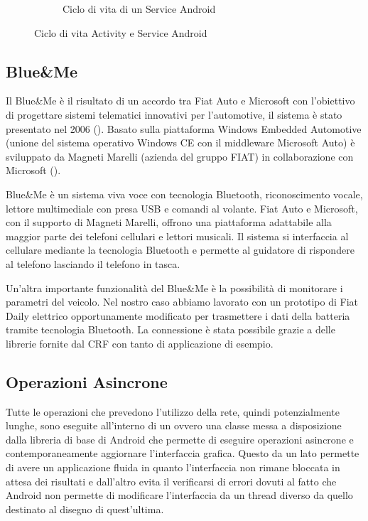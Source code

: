 \begin{figure}[H]
\begin{subfigure}[b]{0.49\textwidth}
			\caption{Ciclo di vita di un Service Android}
			\label{fig:android-service}
		\end{subfigure}
        \caption{Ciclo di vita Activity e Service Android}
\end{figure}

\subsection{Blue\&{}Me}

Il Blue\&{}Me è il risultato di un accordo tra Fiat Auto e Microsoft con l'obiettivo di progettare sistemi telematici innovativi per l'automotive, il sistema è stato presentato nel 2006 (\cite{al2012android}). Basato sulla piattaforma Windows Embedded Automotive (unione del sistema operativo Windows CE con il middleware Microsoft Auto) è sviluppato da Magneti Marelli (azienda del gruppo FIAT) in collaborazione con Microsoft (\cite{wiki:blue-me}).

Blue\&{}Me è un sistema viva voce con tecnologia Bluetooth, riconoscimento vocale, lettore multimediale con presa USB e comandi al volante. Fiat Auto e Microsoft, con il supporto di Magneti Marelli, offrono una piattaforma adattabile alla maggior parte dei telefoni cellulari e lettori musicali. Il sistema si interfaccia al cellulare mediante la tecnologia Bluetooth e permette al guidatore di rispondere al telefono lasciando il telefono in tasca. 

Un'altra importante funzionalità del Blue\&{}Me è la possibilità di monitorare i parametri del veicolo. Nel nostro caso abbiamo lavorato con un prototipo di Fiat Daily elettrico opportunamente modificato per trasmettere i dati della batteria tramite tecnologia Bluetooth. La connessione è stata possibile grazie a delle librerie fornite dal CRF con tanto di applicazione di esempio.

\subsection{Operazioni Asincrone}

Tutte le operazioni che prevedono l'utilizzo della rete, quindi potenzialmente lunghe, sono eseguite all'interno di un  ovvero una classe messa a disposizione dalla libreria di base di Android che permette di eseguire operazioni asincrone e contemporaneamente aggiornare l'interfaccia grafica. Questo da un lato permette di avere un applicazione fluida in quanto l'interfaccia non rimane bloccata in attesa dei risultati e dall'altro evita il verificarsi di errori dovuti al fatto che Android non permette di modificare l'interfaccia da un thread diverso da quello destinato al disegno di quest'ultima.

